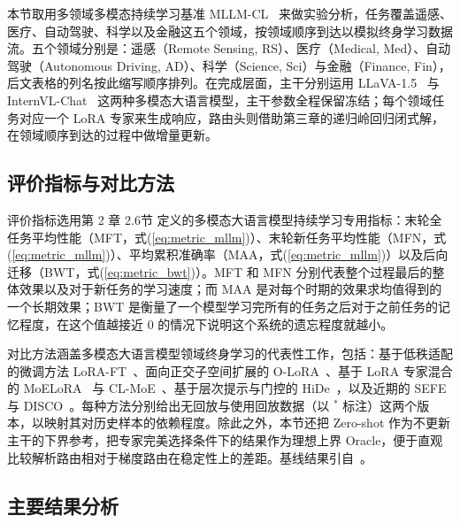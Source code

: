 本节取用多领域多模态持续学习基准 MLLM-CL~\citep{zhao2025mllm} 来做实验分析，任务覆盖遥感、医疗、自动驾驶、科学以及金融这五个领域，按领域顺序到达以模拟终身学习数据流。五个领域分别是：遥感（Remote Sensing, RS）、医疗（Medical, Med）、自动驾驶（Autonomous Driving, AD）、科学（Science, Sci）与金融（Finance, Fin），后文表格的列名按此缩写顺序排列。在完成层面，主干分别运用 LLaVA-1.5~\citep{liu2023llava} 与 InternVL-Chat~\citep{chen2024internvl} 这两种多模态大语言模型，主干参数全程保留冻结；每个领域任务对应一个 LoRA 专家来生成响应，路由头则借助第三章的递归岭回归闭式解，在领域顺序到达的过程中做增量更新。

\subsection{评价指标与对比方法}

评价指标选用第 2 章 2.6节 定义的多模态大语言模型持续学习专用指标：末轮全任务平均性能（MFT，式(\ref{eq:metric_mllm})）、末轮新任务平均性能（MFN，式(\ref{eq:metric_mllm})）、平均累积准确率（MAA，式(\ref{eq:metric_mllm})）以及后向迁移（BWT，式(\ref{eq:metric_bwt})）。MFT 和 MFN 分别代表整个过程最后的整体效果以及对于新任务的学习速度；而 MAA 是对每个时期的效果求均值得到的一个长期效果；BWT 是衡量了一个模型学习完所有的任务之后对于之前任务的记忆程度，在这个值越接近 0 的情况下说明这个系统的遗忘程度就越小。

对比方法涵盖多模态大语言模型领域终身学习的代表性工作，包括：基于低秩适配的微调方法 LoRA-FT~\citep{hu2021lora}、面向正交子空间扩展的 O-LoRA~\citep{wang2023orthogonal}、基于 LoRA 专家混合的 MoELoRA~\citep{chen2024coin} 与 CL-MoE~\citep{huai2025cl}、基于层次提示与门控的 HiDe~\citep{guo2025hide}，以及近期的 SEFE~\citep{chen2025sefe} 与 DISCO~\citep{guo2025federated}。每种方法分别给出无回放与使用回放数据（以 $^{*}$ 标注）这两个版本，以映射其对历史样本的依赖程度。除此之外，本节还把 Zero-shot 作为不更新主干的下界参考，把专家完美选择条件下的结果作为理想上界 Oracle，便于直观比较解析路由相对于梯度路由在稳定性上的差距。基线结果引自~\citep{zhao2025mllm}。

\subsection{主要结果分析}

